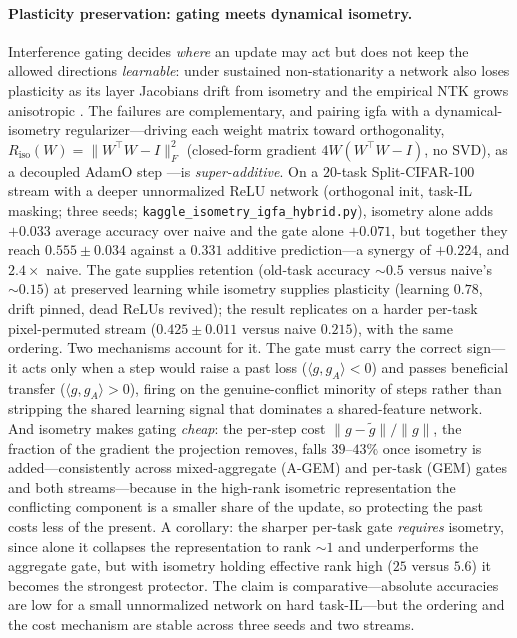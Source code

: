 \documentclass[10pt,a4paper]{article}
\theoremstyle{plain}
\theoremstyle{definition}
\newcommand{\IGFA}{igfa}
\begin{document}
\paragraph{Plasticity preservation: gating meets dynamical isometry.} Interference gating
decides \emph{where} an update may act but does not keep the allowed directions
\emph{learnable}: under sustained non-stationarity a network also loses plasticity as its
layer Jacobians drift from isometry and the empirical NTK grows anisotropic
\cite{rosseau2026isometry}. The failures are complementary, and pairing \IGFA{} with a
dynamical-isometry regularizer---driving each weight matrix toward orthogonality,
$R_{\mathrm{iso}}(W)=\|W^\top W-I\|_F^2$ (closed-form gradient $4W(W^\top W-I)$, no SVD), as
a decoupled AdamO step \cite{rosseau2026isometry}---is \emph{super-additive}. On a
$20$-task Split-CIFAR-100 stream with a deeper unnormalized ReLU network (orthogonal init,
task-IL masking; three seeds; \texttt{kaggle\_isometry\_igfa\_hybrid.py}), isometry alone
adds $+0.033$ average accuracy over naive and the gate alone $+0.071$, but together they
reach $0.555\pm0.034$ against a $0.331$ additive prediction---a synergy of $+0.224$, and
$2.4\times$ naive. The gate supplies retention (old-task accuracy $\sim\!0.5$ versus
naive's $\sim\!0.15$) at preserved learning while isometry supplies plasticity (learning
$0.78$, drift pinned, dead ReLUs revived); the result replicates on a harder per-task
pixel-permuted stream ($0.425\pm0.011$ versus naive $0.215$), with the same ordering. Two
mechanisms account for it. The gate must carry the correct sign---it acts only when a step
would raise a past loss ($\langle g,g_A\rangle<0$) and passes beneficial transfer
($\langle g,g_A\rangle>0$), firing on the genuine-conflict minority of steps rather than
stripping the shared learning signal that dominates a shared-feature network. And isometry
makes gating \emph{cheap}: the per-step cost $\|g-\tilde g\|/\|g\|$, the fraction of the
gradient the projection removes, falls $39$--$43\%$ once isometry is added---consistently
across mixed-aggregate (A-GEM) and per-task (GEM) gates and both streams---because in the
high-rank isometric representation the conflicting component is a smaller share of the
update, so protecting the past costs less of the present. A corollary: the sharper
per-task gate \emph{requires} isometry, since alone it collapses the representation to rank
$\sim\!1$ and underperforms the aggregate gate, but with isometry holding effective rank
high ($25$ versus $5.6$) it becomes the strongest protector. The claim is
comparative---absolute accuracies are low for a small unnormalized network on hard
task-IL---but the ordering and the cost mechanism are stable across three seeds and two
streams.
\end{document}
